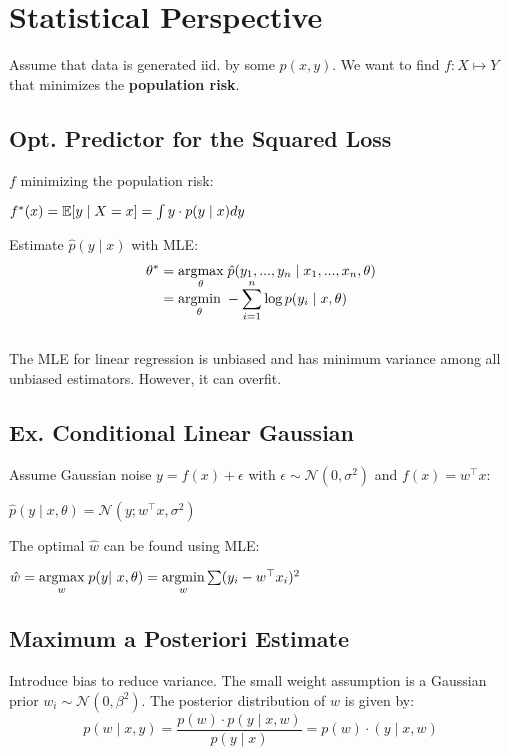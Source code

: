 \section*{Statistical Perspective}

Assume that data is generated iid. by some $p(x, y)$. We want to find $f: X \mapsto Y$ that minimizes the \textbf{population risk}.

\subsection*{Opt. Predictor for the Squared Loss}

$f$ minimizing the population risk:

\qquad $f^*(x) = \mathbb{E}[y \; | \; X = x] = \int y \cdot p(y \; | \; x) dy$

Estimate $\hat{p}(y \; | \; x)$ with MLE:
\begin{align*}
	\theta^* &= \underset{\theta}{\text{argmax}} \; \hat{p}(y_1, ..., y_n \; | \; x_1, ..., x_n, \theta) \\[-10pt]
	&= \underset{\theta}{\text{argmin}} \; - \sum_{i=1}^n \log p(y_i \; | \; x, \theta) 
\end{align*} \\[-11pt]

The MLE for linear regression is unbiased and has minimum variance among all unbiased estimators. However, it can overfit.

\subsection*{Ex. Conditional Linear Gaussian}

Assume Gaussian noise $y = f(x) + \epsilon$ with $\epsilon \sim \mathcal{N}(0, \sigma^2)$ and $f(x) = w^\top x$:

\qquad \qquad $\hat p(y \; | \; x, \theta) = \mathcal{N}(y; w^\top x, \sigma^2)$

The optimal $\hat w$ can be found using MLE:

$\hat w = \argmax{w} \; p(y | x, \theta) =\argmin{w} \sum (y_i - w^\top x_i)^2$

\subsection*{Maximum a Posteriori Estimate}

Introduce bias to reduce variance. The small weight assumption is a Gaussian prior $w_i \sim \mathcal{N}(0, \beta^2)$. The posterior distribution of $w$ is given by:
$$p(w \; | \; x, y) = \frac{p(w) \cdot p( y \; | \; x, w)}{p( y \; | \; x)}  = p(w)\cdotp( y \; | \; x, w)$$

